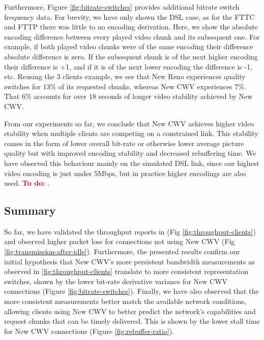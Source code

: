 \documentclass[10pt,sigconf]{acmart}
\newcommand{\todo}[1]{\textbf{\textcolor{red}{To do: #1}}}
\begin{document}
Furthermore, Figure \ref{fig:bitrate-switches} provides additional bitrate switch frequency data. For brevity, we have only shown the DSL case, as for the FTTC and FTTP there was little to no encoding derivation. Here, we show the absolute encoding difference between every played video chunk and its subsequent one. For example, if both played video chunks were of the same encoding their difference absolute difference is zero. If the subsequent chunk is of the next higher encoding their difference is +1, and if it is of the next lower encoding the difference is -1, etc. Reusing the 3 clients example, we see that New Reno experiences quality switches for 13\% of its requested chunks, whereas New CWV experiences 7\%. That 6\% accounts for over 18 seconds of longer video stability achieved by New CWV.

From our experiments so far, we conclude that New CWV achieves higher video stability when multiple clients are competing on a constrained link. This stability comes in the form of lower overall bit-rate or otherwise lower average picture quality but with improved encoding stability and decreased rebuffering time. We have observed this behaviour mainly on the simulated DSL link, since our highest video encoding is just under 5Mbps, but in practice higher encodings are also used. \todo{\cite{}}.


\subsection{Summary}

So far, we have validated the throughput reports in \cite{Nazir-2014-performance-evaluation-congestion-window-validation-dash-newcwv} (Fig \ref{fig:throughput-clients}) and observed higher packet loss for connections not using New CWV (Fig \ref{fig:transmission-after-idle}). Furthermore, the presented results confirm our initial hypothesis that New CWV's more persistent bandwidth measurements as observed in \ref{fig:throughput-clients} translate to more consistent representation switches, shown by the lower bit-rate derivative variance for New CWV connections (Figure \ref{fig:bitrate-switches}). Finally, we have also observed that the more consistent measurements better match the available network conditions, allowing clients using New CWV to better predict the network's capabilities and request chunks that can be timely delivered. This is shown by the lower stall time for New CWV connections (Figure \ref{fig:rebuffer-ratio}).

\end{document}
